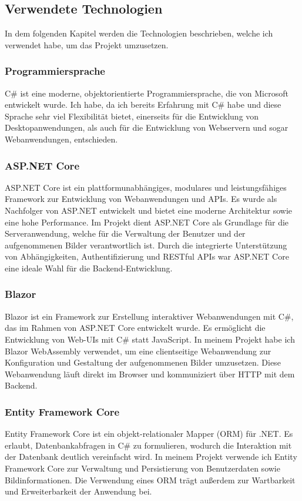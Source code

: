 \newpage

\subsection{Verwendete Technologien}

In dem folgenden Kapitel werden die Technologien beschrieben, welche ich verwendet habe,
um das Projekt umzusetzen.

\subsubsection{Programmiersprache}
C\# ist eine moderne, objektorientierte Programmiersprache, die von Microsoft entwickelt wurde.
Ich habe, da ich bereits Erfahrung mit C\# habe und diese Sprache sehr viel Flexibilität bietet,
einerseits für die Entwicklung von Desktopanwendungen, als auch für die Entwicklung
von Webservern und sogar Webanwendungen, entschieden.

\subsubsection{ASP.NET Core}
ASP.NET Core ist ein plattformunabhängiges, modulares und leistungsfähiges
Framework zur Entwicklung von Webanwendungen und APIs. Es wurde als Nachfolger
von ASP.NET entwickelt und bietet eine moderne Architektur sowie eine hohe
Performance. Im Projekt dient ASP.NET Core als Grundlage für die Serveranwendung,
welche für die Verwaltung der Benutzer und der aufgenommenen Bilder verantwortlich ist.
Durch die integrierte Unterstützung von Abhängigkeiten, Authentifizierung und RESTful
APIs war ASP.NET Core eine ideale Wahl für die Backend-Entwicklung.

\subsubsection{Blazor}
Blazor ist ein Framework zur Erstellung interaktiver Webanwendungen mit C\#,
das im Rahmen von ASP.NET Core entwickelt wurde. Es ermöglicht die Entwicklung
von Web-UIs mit C\# statt JavaScript. In meinem Projekt habe ich Blazor WebAssembly
verwendet, um eine clientseitige Webanwendung zur Konfiguration und Gestaltung
der aufgenommenen Bilder umzusetzen. Diese Webanwendung läuft direkt im Browser
und kommuniziert über HTTP mit dem Backend.

\subsubsection{Entity Framework Core}
Entity Framework Core ist ein objekt-relationaler Mapper (ORM) für .NET.
Es erlaubt, Datenbankabfragen in C\# zu formulieren, wodurch die Interaktion
mit der Datenbank deutlich vereinfacht wird. In meinem Projekt verwende ich
Entity Framework Core zur Verwaltung und Persistierung von Benutzerdaten sowie
Bildinformationen. Die Verwendung eines ORM trägt außerdem zur Wartbarkeit und
Erweiterbarkeit der Anwendung bei.

